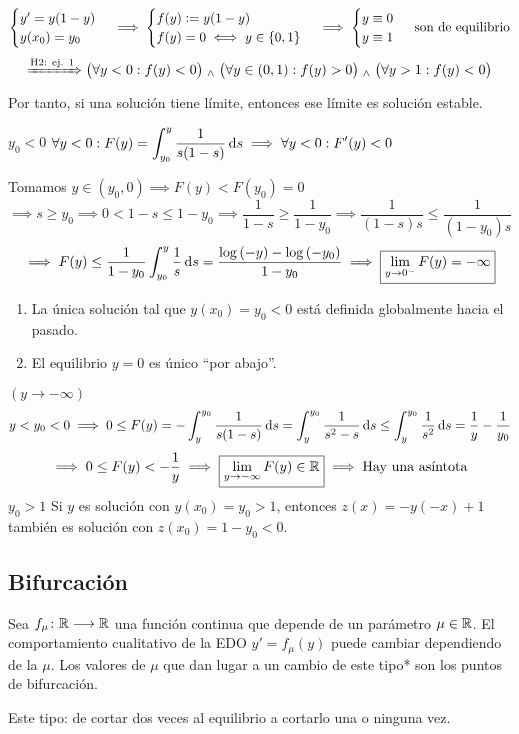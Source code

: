 \begin{ejem}
	\[\begin{cases}
			y'=y(1-y) \\
			y(x_0)=y_0
		\end{cases} \implies \begin{cases}
			f(y)\vcentcolon= y(1-y) \\
			f(y) = 0 \iff y \in \{0, 1\}
		\end{cases} \implies \begin{cases}
			y \equiv 0 \\
			y \equiv 1 \\
		\end{cases}\text{ son de equilibrio}\]
	\[\xRightarrow{\text{H2: ej. 1}} \big(\forall y < 0 :f(y) < 0\big) \; _{\wedge} \; \big(\forall y \in (0, 1) : f(y) > 0\big) \; _{\wedge} \; \big(\forall y > 1 : f(y) < 0\big)\]
	Por tanto, si una solución tiene límite, entonces ese límite es solución estable.

	$\boxed{y_0 < 0}$ \hspace{1cm}$\ds \forall y < 0 : F(y)=\int_{y_0}^{y}\frac{1}{s(1-s)}\odif{s} \implies \forall y<0 : F'(y)<0$

	Tomamos $y\in (y_0, 0) \implies F(y)<F(y_0)=0$
	\[\implies s \geq y_0 \implies 0<1-s \leq 1-y_0 \implies \frac{1}{1-s}\geq\frac{1}{1-y_0} \implies \frac{1}{(1-s)s}\leq \frac{1}{(1-y_0)s}\]
	\[\implies F(y) \leq \frac{1}{1-y_0}\int_{y_0}^{y} \frac{1}{s} \odif{s} = \frac{\log{(-y)} - \log{(-y_0)}}{1-y_0} \implies \boxed{\lim_{y\to0^-} F(y) = -\infty}\]
	\begin{enumerate}
		\item La única solución tal que $y(x_0)=y_0<0$ está definida globalmente hacia el pasado.
		\item El equilibrio $y=0$ es único ``por abajo''.
	\end{enumerate}
	$(y\to-\infty)$
	\[y<y_0<0 \implies 0 \leq F(y)=-\int_{y}^{y_0} \frac{1}{s(1-s)} \odif{s} = \int_{y}^{y_0} \frac{1}{s^2-s} \odif{s} \leq \int_{y}^{y_0} \frac{1}{s^2} \odif{s} = \frac{1}{y} -\frac{1}{y_0}\]
	\[\implies 0\leq F(y) < -\frac{1}{y} \implies \boxed{\lim_{y\to -\infty} F(y) \in \mathbb{R}} \implies \text{Hay una asíntota}\]
	$\boxed{y_0>1}$ Si $y$ es solución con $y(x_0)=y_0>1$, entonces $z(x)=-y(-x)+1$ también es solución con $z(x_0)=1-y_0<0$.
\end{ejem}

\subsection{Bifurcación}
\begin{defn}
	Sea $f_\mu \colon \mathbb{R} \longrightarrow \mathbb{R}$ una función continua que depende de un parámetro $\mu \in \mathbb{R}$. El comportamiento cualitativo de la EDO $y'=f_\mu(y)$ puede cambiar dependiendo de la $\mu$. Los valores de $\mu$ que dan lugar a un cambio de este tipo* son los puntos de bifurcación.

	\hfill *Este tipo: de cortar dos veces al equilibrio a cortarlo una o ninguna vez.
\end{defn}

